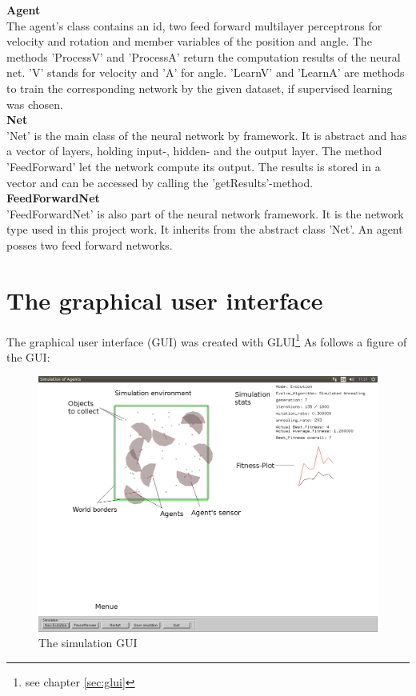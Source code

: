 \documentclass[10pt,a4paper,DIV=11]{scrreprt}
\begin{document}
\textbf{Agent} \\
The agent's class contains an id, two feed forward multilayer perceptrons for velocity and rotation and member variables of the position and angle.
The methods 'ProcessV' and 'ProcessA' return the computation results of the neural net. 'V' stands for velocity and 'A' for angle.
'LearnV' and 'LearnA' are methods to train the corresponding network by the given dataset, if supervised learning was chosen. \\

\textbf{Net} \\
'Net' is the main class of the neural network by framework\cite{Jona}. It is abstract and has a vector of layers, holding input-, hidden- and the output layer.  The method 'FeedForward' let the network compute its output. The results is stored in a vector and can be accessed by calling the 'getResults'-method. \\

\textbf{FeedForwardNet} \\
'FeedForwardNet' is also part of the neural network framework. It is the network type used in this project work. It inherits from the abstract class 'Net'. An agent posses two feed forward networks. \\

\newpage
\section{The graphical user interface}

The graphical user interface (GUI) was created with GLUI\footnote{see chapter \ref{sec:glui}}
As follows a figure of the GUI:

\begin{center}
	\begin{figure}[H]
		\centering
		\includegraphics[width=1.0\textwidth,scale=1.0]{files/simuinaction.png}  
		\caption{The simulation GUI}
		\label{fig:sim-gui}
	\end{figure}
\end{center}
\end{document}
